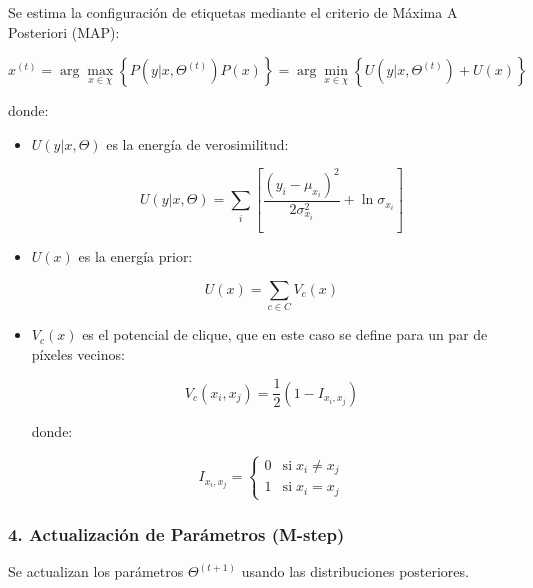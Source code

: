 Se estima la configuración de etiquetas mediante el criterio de Máxima A Posteriori (MAP):

$$x^{(t)} =\arg \max_{x\in \chi } \left\lbrace P(y|x,\Theta^{(t)} )P(x)\right\rbrace =\arg \min_{x\in \chi } \left\lbrace U(y|x,\Theta^{(t)} )+U(x)\right\rbrace$$

donde:

\begin{itemize}
\setlength{\itemsep}{-1ex}
    \item{\begin{flushleft} $U(y|x,\Theta )$ es la energía de verosimilitud: \end{flushleft}}

    $$U(y|x,\Theta )=\sum_i \left\lbrack \frac{(y_i -\mu_{x_i } )^2 }{2\sigma_{x_i }^2 }+\ln \sigma_{x_i } \right\rbrack$$

    \item{\begin{flushleft} $U(x)$ es la energía prior: \end{flushleft}}

    $$U(x)=\sum_{c\in C} V_c (x)$$

    \item{\begin{flushleft} $V_c (x)$ es el potencial de clique, que en este caso se define para un par de píxeles vecinos: \end{flushleft}}

    $$V_c (x_i ,x_j )=\frac{1}{2}(1-I_{x_i ,x_j } )$$
    
    donde:
    
    \begin{par}
    $$I_{x_i ,x_j } =\left\lbrace \begin{array}{cc}
    0 & \textrm{si}\;x_i \not= x_j \\
    1 & \textrm{si}\;x_i =x_j 
    \end{array}\right.$$
    \end{par}
\end{itemize}

\subsubsection{4. Actualización de Parámetros (M-step)}

Se actualizan los parámetros $\Theta^{(t+1)}$ usando las distribuciones posteriores.

